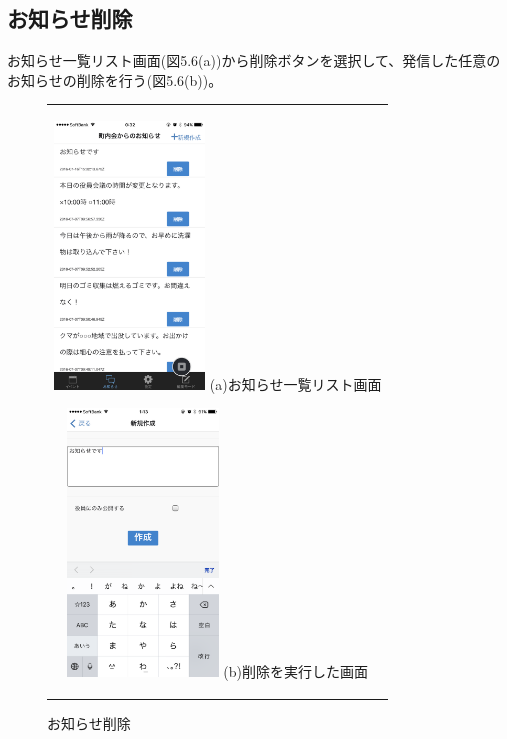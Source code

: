 \subsection{お知らせ削除}%
お知らせ一覧リスト画面(図5.6(a))から削除ボタンを選択して、発信した任意のお知らせの削除を行う(図5.6(b))。

\begin{figure}[htbp]
  \begin{center}
    \begin{tabular}{c}

      \begin{minipage}{0.33\hsize}
        \begin{center}
\includegraphics[width=4cm]{notification_list_after_add.PNG}
          \hspace{1cm} %
          {\footnotesize (a)お知らせ一覧リスト画面}
        \end{center}
      \end{minipage}

      \begin{minipage}{0.33\hsize}
        \begin{center}
\includegraphics[width=4cm]{notification_add.PNG}
          \hspace{1cm}%
          {\footnotesize (b)削除を実行した画面}
        \end{center}
      \end{minipage}

    \end{tabular}
    \caption{お知らせ削除}
    \label{fig:lena}
  \end{center}
\end{figure}

